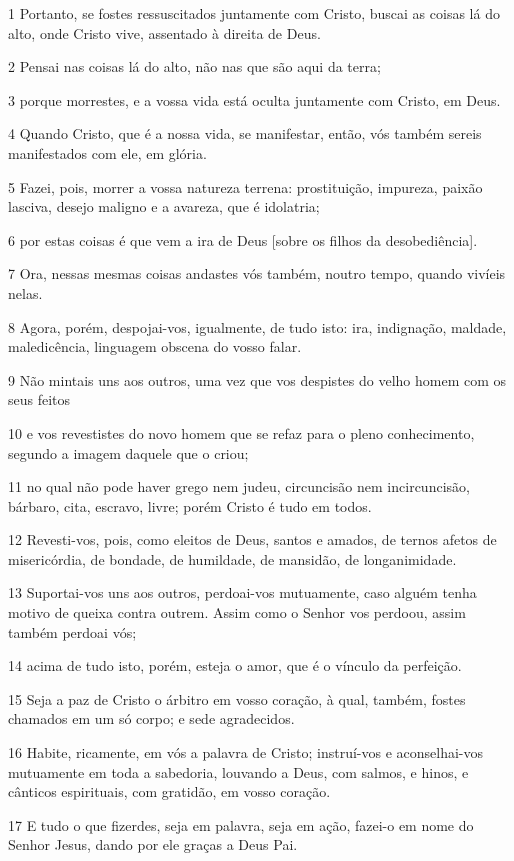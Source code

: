 \par 1 Portanto, se fostes ressuscitados juntamente com Cristo, buscai as coisas lá do alto, onde Cristo vive, assentado à direita de Deus.
\par 2 Pensai nas coisas lá do alto, não nas que são aqui da terra;
\par 3 porque morrestes, e a vossa vida está oculta juntamente com Cristo, em Deus.
\par 4 Quando Cristo, que é a nossa vida, se manifestar, então, vós também sereis manifestados com ele, em glória.
\par 5 Fazei, pois, morrer a vossa natureza terrena: prostituição, impureza, paixão lasciva, desejo maligno e a avareza, que é idolatria;
\par 6 por estas coisas é que vem a ira de Deus [sobre os filhos da desobediência].
\par 7 Ora, nessas mesmas coisas andastes vós também, noutro tempo, quando vivíeis nelas.
\par 8 Agora, porém, despojai-vos, igualmente, de tudo isto: ira, indignação, maldade, maledicência, linguagem obscena do vosso falar.
\par 9 Não mintais uns aos outros, uma vez que vos despistes do velho homem com os seus feitos
\par 10 e vos revestistes do novo homem que se refaz para o pleno conhecimento, segundo a imagem daquele que o criou;
\par 11 no qual não pode haver grego nem judeu, circuncisão nem incircuncisão, bárbaro, cita, escravo, livre; porém Cristo é tudo em todos.
\par 12 Revesti-vos, pois, como eleitos de Deus, santos e amados, de ternos afetos de misericórdia, de bondade, de humildade, de mansidão, de longanimidade.
\par 13 Suportai-vos uns aos outros, perdoai-vos mutuamente, caso alguém tenha motivo de queixa contra outrem. Assim como o Senhor vos perdoou, assim também perdoai vós;
\par 14 acima de tudo isto, porém, esteja o amor, que é o vínculo da perfeição.
\par 15 Seja a paz de Cristo o árbitro em vosso coração, à qual, também, fostes chamados em um só corpo; e sede agradecidos.
\par 16 Habite, ricamente, em vós a palavra de Cristo; instruí-vos e aconselhai-vos mutuamente em toda a sabedoria, louvando a Deus, com salmos, e hinos, e cânticos espirituais, com gratidão, em vosso coração.
\par 17 E tudo o que fizerdes, seja em palavra, seja em ação, fazei-o em nome do Senhor Jesus, dando por ele graças a Deus Pai.
